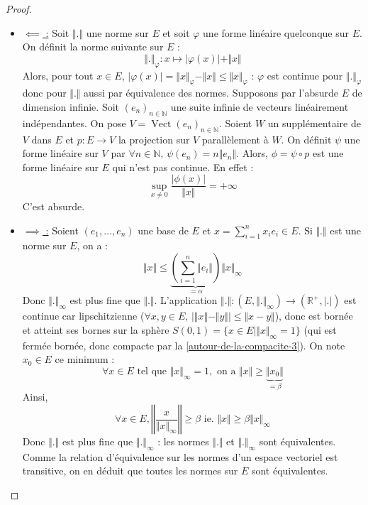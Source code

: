   \begin{proof}
    \begin{itemize}
      \item \underline{$\impliedby$ :} Soit $\Vert . \Vert$ une norme sur $E$ et soit $\varphi$ une forme linéaire quelconque sur $E$. On définit la norme suivante sur $E$ :
      \[ \Vert . \Vert_{\varphi} : x \mapsto \vert \varphi(x) \vert + \Vert x \Vert \]
      Alors, pour tout $x \in E$, $\vert \varphi(x) \vert = \Vert x \Vert_{\varphi} - \Vert x \Vert \leq \Vert x \Vert_{\varphi}$ : $\varphi$ est continue pour $\Vert . \Vert_{\varphi}$ donc pour $\Vert . \Vert$ aussi par équivalence des normes.
      \newpar
      Supposons par l'absurde $E$ de dimension infinie. Soit $(e_n)_{n \in \mathbb{N}}$ une suite infinie de vecteurs linéairement indépendantes. On pose $V = \operatorname{Vect}(e_n)_{n \in \mathbb{N}}$. Soient $W$ un supplémentaire de $V$ dans $E$ et $p : E \rightarrow V$ la projection sur $V$ parallèlement à $W$. On définit $\psi$ une forme linéaire sur $V$ par $\forall n \in \mathbb{N}$, $\psi (e_n) = n \Vert e_n \Vert$. Alors, $\phi = \psi \circ p$ est une forme linéaire sur $E$ qui n'est pas continue. En effet :
      \[ \sup_{x \neq 0} \frac{\vert \phi(x) \vert}{\Vert x \Vert} = +\infty \]
      C'est absurde.
      \item \underline{$\implies$ :}
      Soient $(e_1, \dots, e_n)$ une base de $E$ et $x = \sum_{i=1}^n x_i e_i \in E$. Si $\Vert . \Vert$ est une norme sur $E$, on a :
      \[ \Vert x \Vert \leq \underbrace{\left( \sum_{i=1}^n \Vert e_i \Vert \right)}_{= \alpha} \Vert x \Vert_\infty \]
      Donc $\Vert . \Vert_\infty$ est plus fine que $\Vert . \Vert$.
      \newpar
      L'application $\Vert . \Vert : (E, \Vert . \Vert_\infty) \rightarrow (\mathbb{R}^+, \vert . \vert)$ est continue car lipschitzienne ($\forall x, y \in E, \, \vert \Vert x \Vert - \Vert y \Vert \vert \leq \Vert x - y \Vert$), donc est bornée et atteint ses bornes sur la sphère $S(0,1) = \{ x \in E \mid \Vert x \Vert_\infty = 1 \}$ (qui est fermée bornée, donc compacte par la \cref{autour-de-la-compacite-3}). On note $x_0 \in E$ ce minimum :
      \[ \forall x \in E \text{ tel que } \Vert x \Vert_\infty = 1, \text{ on a } \Vert x \Vert \geq \underbrace{\Vert x_0 \Vert}_{= \beta} \]
      Ainsi,
      \[ \forall x \in E, \left\Vert \frac{x}{\Vert x \Vert_\infty} \right\Vert \geq \beta \text{ ie. } \Vert x \Vert \geq \beta \Vert x \Vert_\infty \]
      Donc $\Vert . \Vert$ est plus fine que $\Vert . \Vert_\infty$ : les normes $\Vert . \Vert$ et $\Vert . \Vert_\infty$ sont équivalentes. Comme la relation d'équivalence sur les normes d'un espace vectoriel est transitive, on en déduit que toutes les normes sur $E$ sont équivalentes.
    \end{itemize}
  \end{proof}

